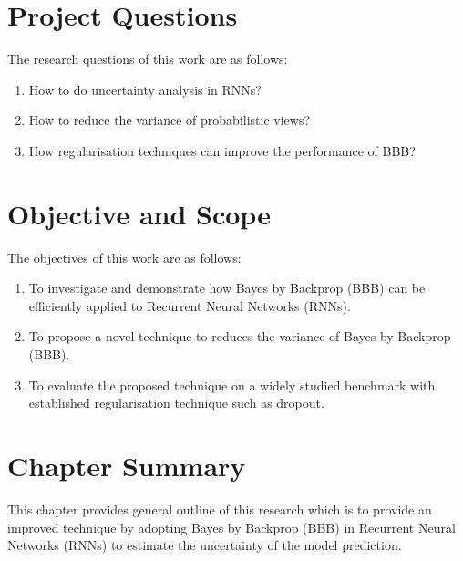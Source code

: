 \section{Project Questions}

The research questions of this work are as follows:
\begin{enumerate}
	\item How to do uncertainty analysis in RNNs?
	\item How to reduce the variance of probabilistic views?
	\item How regularisation techniques can improve the performance of BBB?
\end{enumerate}

\section{Objective and Scope}

The objectives of this work are as follows:
\begin{enumerate}
	\item To investigate and demonstrate how Bayes by Backprop (BBB) can be efficiently applied to Recurrent Neural Networks (RNNs).
	\item To propose a novel technique to reduces the variance of Bayes by Backprop (BBB).
	\item To evaluate the proposed technique on a widely studied benchmark with established regularisation technique such as dropout.
\end{enumerate}

\section{Chapter Summary}
This chapter provides general outline of this research which is to provide an improved technique by adopting Bayes by Backprop (BBB) in Recurrent Neural Networks (RNNs) to estimate the uncertainty of the model prediction.